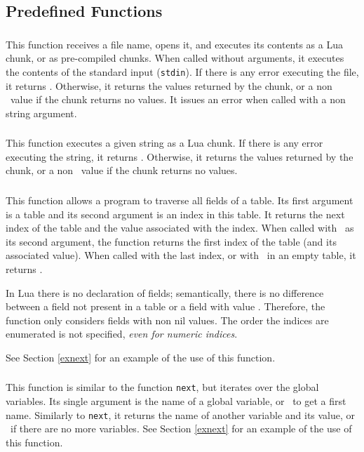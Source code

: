 \subsection{Predefined Functions}

\subsubsection*{}
This function receives a file name,
opens it, and executes its contents as a Lua chunk,
or as pre-compiled chunks.
When called without arguments,
it executes the contents of the standard input (\verb'stdin').
If there is any error executing the file, it returns \nil.
Otherwise, it returns the values returned by the chunk,
or a non \nil\ value if the chunk returns no values.
It issues an error when called with a non string argument.

\subsubsection*{}
This function executes a given string as a Lua chunk.
If there is any error executing the string, it returns \nil.
Otherwise, it returns the values returned by the chunk,
or a non \nil\ value if the chunk returns no values.

\subsubsection*{}
This function allows a program to traverse all fields of a table.
Its first argument is a table and its second argument
is an index in this table.
It returns the next index of the table and the
value associated with the index.
When called with \nil\ as its second argument,
the function returns the first index
of the table (and its associated value).
When called with the last index, or with \nil\ in an empty table,
it returns \nil.

In Lua there is no declaration of fields;
semantically, there is no difference between a
field not present in a table or a field with value \nil.
Therefore, the function only considers fields with non nil values.
The order the indices are enumerated is not specified,
{\em even for numeric indices}.

See Section \ref{exnext} for an example of the use of this function.

\subsubsection*{}
This function is similar to the function \verb'next',
but iterates over the global variables.
Its single argument is the name of a global variable,
or \nil\ to get a first name.
Similarly to \verb'next', it returns the name of another variable
and its value,
or \nil\ if there are no more variables.
See Section \ref{exnext} for an example of the use of this function.

